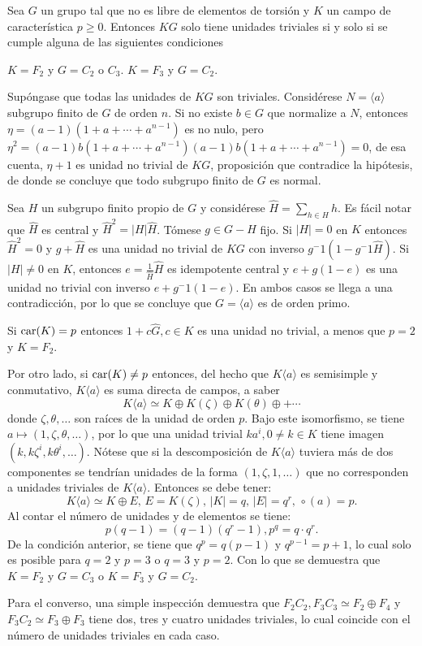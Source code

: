 \begin{proposicion}\label{prop:UnidadesTriviales}
Sea $G$ un grupo tal que no es libre de elementos de torsión y $K$ un campo de característica $p\geq 0$. Entonces $KG$ solo tiene unidades triviales si y solo si se cumple alguna de las siguientes condiciones
\begin{bulletList}
\newItem $K=F_2$ y $G=C_2$ o $C_3$.
\newItem $K=F_3$ y $G=C_2$.
\end{bulletList}
\end{proposicion}
\begin{proof*}
Supóngase que todas las unidades de $KG$ son triviales. Considérese $N=\langle a \rangle$ subgrupo finito de $G$ de orden $n$. Si no existe $b \in G$ que normalize a $N$, entonces $\eta = (a-1)(1+a+\cdots + a^{n-1})$ es no nulo, pero $\eta^2 = (a-1)b(1+a+\cdots+a^{n-1})(a-1)b(1+a+\cdots+a^{n-1})=0$, de esa cuenta, $\eta +1$ es unidad no trivial de $KG$, proposición que contradice la hipótesis, de donde se concluye que todo subgrupo finito de $G$ es normal.

Sea $H$ un subgrupo finito propio de $G$ y considérese $\hat{H} = \sum_{h \in H}h$. Es fácil notar que  $\hat{H}$ es central y $\hat{H}^2 = |H|\hat{H} $. Tómese $g \in G-H$ fijo. Si $|H| =0$ en $K$ entonces $\hat{H}^2 = 0$ y $g + \hat{H}$ es una unidad no trivial de $KG$ con inverso $g^-1(1-g^-1\hat{H})$. Si $|H| \neq 0$ en $K$, entonces $e = \frac{1}{\hat{H}}\hat{H}$ es idempotente central y $e +g(1-e)$ es una unidad no trivial con inverso $e+g^-1(1-e)$. En ambos casos se llega a una contradicción, por lo que se concluye que $G = \langle a \rangle$ es de orden primo.

Si $\operatorname{car} (K) = p$ entonces $1+c\hat{G}, c \in K$ es una unidad no trivial, a menos que $p=2$ y $K=F_2$. 

Por otro lado, si $\operatorname{car}(K) \neq p$ entonces, del hecho que $K\langle a \rangle$ es semisimple y conmutativo, $K\langle a \rangle$ es suma directa de campos, a saber
\[ K \langle a \rangle \simeq K\oplus K(\zeta) \oplus K(\theta) \oplus + \cdots \] donde $\zeta, \theta, \dots$ son raíces de la unidad de orden $p$. Bajo este isomorfismo, se tiene $a \mapsto (1,\zeta,\theta,\dots)$, por lo que una unidad trivial $ka^ i, 0\neq k \in K$ tiene imagen $(k,k\zeta^i,k\theta^i,\dots)$. Nótese que si la descomposición de $K\langle a\rangle$ tuviera más de dos componentes se tendrían unidades de la forma $(1,\zeta,1,\dots)$ que no corresponden a unidades triviales de $K\langle a \rangle$.
Entonces se debe tener: \[ K\langle a \rangle \simeq K \oplus E\mbox{, } E = K(\zeta)\mbox{, } |K|=q\mbox{, } |E|=q^r\mbox{, } \circ(a) = p. \] Al contar el número de unidades y de elementos se tiene: \[ p(q-1) = (q-1)(q^r-1), p^q = q\cdot q^r. \] 
\indent De la condición anterior, se tiene que $q^p = q(p-1)$ y $q^{p-1} = p+1$, lo cual solo es posible para $q=2$ y $p=3$ o $q=3$ y $p=2$. Con lo que se demuestra que $K=F_2$ y $G=C_3$ o $K=F_3$ y $G=C_2$.

Para el converso, una simple inspección demuestra que $F_2C_2, F_3C_3 \simeq F_2\oplus F_4$ y $F_3C_2 \simeq F_3 \oplus F_3$ tiene dos, tres y cuatro unidades triviales, lo cual coincide con el número de unidades triviales en cada caso. 
\end{proof*}

